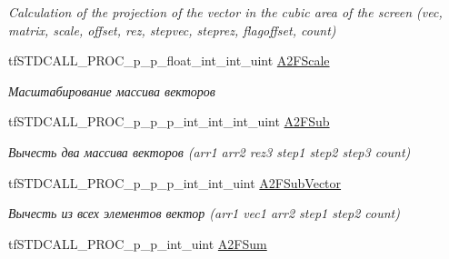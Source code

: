 \begin{DoxyCompactItemize}
\begin{DoxyCompactList}\small\item\em Calculation of the projection of the vector in the cubic area of the screen (vec, matrix, scale, offset, rez, stepvec, steprez, flagoffset, count) \end{DoxyCompactList}\item 
\hypertarget{structs_functions_array_vector_c_p_u_a627245de45d86fd1ce09aa5a73e657ab}{tf\-S\-T\-D\-C\-A\-L\-L\-\_\-\-P\-R\-O\-C\-\_\-p\-\_\-p\-\_\-float\-\_\-int\-\_\-int\-\_\-uint \hyperlink{structs_functions_array_vector_c_p_u_a627245de45d86fd1ce09aa5a73e657ab}{A2\-F\-Scale}}\label{structs_functions_array_vector_c_p_u_a627245de45d86fd1ce09aa5a73e657ab}

\begin{DoxyCompactList}\small\item\em Масштабирование массива векторов \end{DoxyCompactList}\item 
\hypertarget{structs_functions_array_vector_c_p_u_a4334e250ffc83c90f534ff5ee6bb66fb}{tf\-S\-T\-D\-C\-A\-L\-L\-\_\-\-P\-R\-O\-C\-\_\-p\-\_\-p\-\_\-p\-\_\-int\-\_\-int\-\_\-int\-\_\-uint \hyperlink{structs_functions_array_vector_c_p_u_a4334e250ffc83c90f534ff5ee6bb66fb}{A2\-F\-Sub}}\label{structs_functions_array_vector_c_p_u_a4334e250ffc83c90f534ff5ee6bb66fb}

\begin{DoxyCompactList}\small\item\em Вычесть два массива векторов (arr1 arr2 rez3 step1 step2 step3 count) \end{DoxyCompactList}\item 
\hypertarget{structs_functions_array_vector_c_p_u_acdbd59d5b39f9b6cade197db10cb3e88}{tf\-S\-T\-D\-C\-A\-L\-L\-\_\-\-P\-R\-O\-C\-\_\-p\-\_\-p\-\_\-p\-\_\-int\-\_\-int\-\_\-uint \hyperlink{structs_functions_array_vector_c_p_u_acdbd59d5b39f9b6cade197db10cb3e88}{A2\-F\-Sub\-Vector}}\label{structs_functions_array_vector_c_p_u_acdbd59d5b39f9b6cade197db10cb3e88}

\begin{DoxyCompactList}\small\item\em Вычесть из всех элементов вектор (arr1 vec1 arr2 step1 step2 count) \end{DoxyCompactList}\item 
\hypertarget{structs_functions_array_vector_c_p_u_aed55b8638a6f47a6885d4afc233acf63}{tf\-S\-T\-D\-C\-A\-L\-L\-\_\-\-P\-R\-O\-C\-\_\-p\-\_\-p\-\_\-int\-\_\-uint \hyperlink{structs_functions_array_vector_c_p_u_aed55b8638a6f47a6885d4afc233acf63}{A2\-F\-Sum}}\label{structs_functions_array_vector_c_p_u_aed55b8638a6f47a6885d4afc233acf63}


\end{DoxyCompactItemize}
